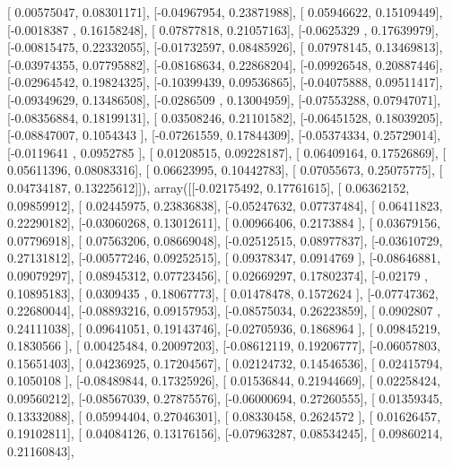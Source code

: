 \documentclass{article}
\begin{document}
       [ 0.00575047,  0.08301171],
       [-0.04967954,  0.23871988],
       [ 0.05946622,  0.15109449],
       [-0.0018387 ,  0.16158248],
       [ 0.07877818,  0.21057163],
       [-0.0625329 ,  0.17639979],
       [-0.00815475,  0.22332055],
       [-0.01732597,  0.08485926],
       [ 0.07978145,  0.13469813],
       [-0.03974355,  0.07795882],
       [-0.08168634,  0.22868204],
       [-0.09926548,  0.20887446],
       [-0.02964542,  0.19824325],
       [-0.10399439,  0.09536865],
       [-0.04075888,  0.09511417],
       [-0.09349629,  0.13486508],
       [-0.0286509 ,  0.13004959],
       [-0.07553288,  0.07947071],
       [-0.08356884,  0.18199131],
       [ 0.03508246,  0.21101582],
       [-0.06451528,  0.18039205],
       [-0.08847007,  0.1054343 ],
       [-0.07261559,  0.17844309],
       [-0.05374334,  0.25729014],
       [-0.0119641 ,  0.0952785 ],
       [ 0.01208515,  0.09228187],
       [ 0.06409164,  0.17526869],
       [ 0.05611396,  0.08083316],
       [ 0.06623995,  0.10442783],
       [ 0.07055673,  0.25075775],
       [ 0.04734187,  0.13225612]]), array([[-0.02175492,  0.17761615],
       [ 0.06362152,  0.09859912],
       [ 0.02445975,  0.23836838],
       [-0.05247632,  0.07737484],
       [ 0.06411823,  0.22290182],
       [-0.03060268,  0.13012611],
       [ 0.00966406,  0.2173884 ],
       [ 0.03679156,  0.07796918],
       [ 0.07563206,  0.08669048],
       [-0.02512515,  0.08977837],
       [-0.03610729,  0.27131812],
       [-0.00577246,  0.09252515],
       [ 0.09378347,  0.0914769 ],
       [-0.08646881,  0.09079297],
       [ 0.08945312,  0.07723456],
       [ 0.02669297,  0.17802374],
       [-0.02179   ,  0.10895183],
       [ 0.0309435 ,  0.18067773],
       [ 0.01478478,  0.1572624 ],
       [-0.07747362,  0.22680044],
       [-0.08893216,  0.09157953],
       [-0.08575034,  0.26223859],
       [ 0.0902807 ,  0.24111038],
       [ 0.09641051,  0.19143746],
       [-0.02705936,  0.1868964 ],
       [ 0.09845219,  0.1830566 ],
       [ 0.00425484,  0.20097203],
       [-0.08612119,  0.19206777],
       [-0.06057803,  0.15651403],
       [ 0.04236925,  0.17204567],
       [ 0.02124732,  0.14546536],
       [ 0.02415794,  0.1050108 ],
       [-0.08489844,  0.17325926],
       [ 0.01536844,  0.21944669],
       [ 0.02258424,  0.09560212],
       [-0.08567039,  0.27875576],
       [-0.06000694,  0.27260555],
       [ 0.01359345,  0.13332088],
       [ 0.05994404,  0.27046301],
       [ 0.08330458,  0.2624572 ],
       [ 0.01626457,  0.19102811],
       [ 0.04084126,  0.13176156],
       [-0.07963287,  0.08534245],
       [ 0.09860214,  0.21160843],
\end{document}
